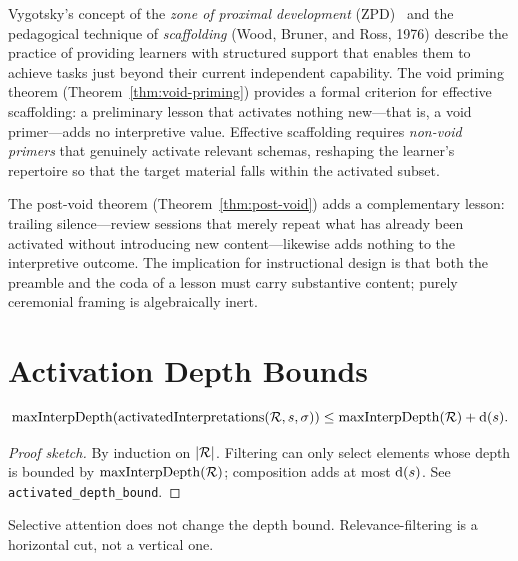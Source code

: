 \begin{remark}
\label{rem:scaffolding}
Vygotsky's concept of the \emph{zone of proximal development}
(ZPD)~\cite{vygotsky1978} and the pedagogical technique of
\emph{scaffolding} (Wood, Bruner, and Ross, 1976) describe the
practice of providing learners with structured support that enables
them to achieve tasks just beyond their current independent
capability.  The void priming theorem
(Theorem~\ref{thm:void-priming}) provides a formal criterion for
effective scaffolding: a preliminary lesson that activates nothing
new---that is, a void primer---adds no interpretive value.  Effective
scaffolding requires \emph{non-void primers} that genuinely activate
relevant schemas, reshaping the learner's repertoire so that the
target material falls within the activated subset.

The post-void theorem (Theorem~\ref{thm:post-void}) adds a
complementary lesson: trailing silence---review sessions that merely
repeat what has already been activated without introducing new
content---likewise adds nothing to the interpretive outcome.  The
implication for instructional design is that both the preamble and the
coda of a lesson must carry substantive content; purely ceremonial
framing is algebraically inert.
\end{remark}

\section{Activation Depth Bounds}
\label{sec:ch4:depth-bounds}

\begin{theorem}
\label{thm:activated-depth}
\[
  \operatorname{maxInterpDepth}(\operatorname{activatedInterpretations}(\mathcal{R}, s, \sigma))
  \leq \operatorname{maxInterpDepth}(\mathcal{R}) + \operatorname{d}(s).
\]
\end{theorem}

\begin{proof}[Proof sketch]
By induction on $|\mathcal{R}|$.  Filtering can only select elements whose
depth is bounded by $\operatorname{maxInterpDepth}(\mathcal{R})$; composition
adds at most $\operatorname{d}(s)$.
See \texttt{activated\_depth\_bound}.
\end{proof}

\begin{remark}
Selective attention does not change the depth bound.  Relevance-filtering
is a horizontal cut, not a vertical one.
\end{remark}

